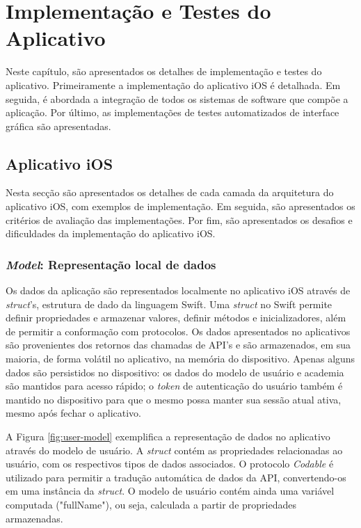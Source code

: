 \chapter{Implementação e Testes do Aplicativo} \label{cap:development}
Neste capítulo, são apresentados os detalhes de implementação e testes do aplicativo. Primeiramente a implementação do aplicativo iOS é detalhada. Em seguida, é abordada a integração de todos os sistemas de software que compõe a aplicação. Por último, as implementações de testes automatizados de interface gráfica são apresentadas. 

\section{Aplicativo iOS}
Nesta secção são apresentados os detalhes de cada camada da arquitetura do aplicativo iOS, com exemplos de implementação. Em seguida, são apresentados os critérios de avaliação das implementações. Por fim, são apresentados os desafios e dificuldades da implementação do aplicativo iOS.

\subsection{\textit{Model}: Representação local de dados}
Os dados da aplicação são representados localmente no aplicativo iOS através de \textit{struct}'s, estrutura de dado da linguagem Swift. Uma \textit{struct} no Swift permite definir propriedades e armazenar valores, definir métodos e inicializadores, além de permitir a conformação com protocolos. Os dados apresentados no aplicativos são provenientes dos retornos das chamadas de API's e são armazenados, em sua maioria, de forma volátil no aplicativo, na memória do dispositivo. Apenas alguns dados são persistidos no dispositivo: os dados do modelo de usuário e academia são mantidos para acesso rápido; o \textit{token} de autenticação do usuário também é mantido no dispositivo para que o mesmo possa manter sua sessão atual ativa, mesmo após fechar o aplicativo.


A Figura \ref{fig:user-model} exemplifica a representação de dados no aplicativo através do modelo de usuário. A \textit{struct} contém as propriedades relacionadas ao usuário, com os respectivos tipos de dados associados. O protocolo \textit{Codable} é utilizado para permitir a tradução automática de dados da API, convertendo-os em uma instância da \textit{struct}. O modelo de usuário contém ainda uma variável computada ("fullName"), ou seja, calculada a partir de propriedades armazenadas.

